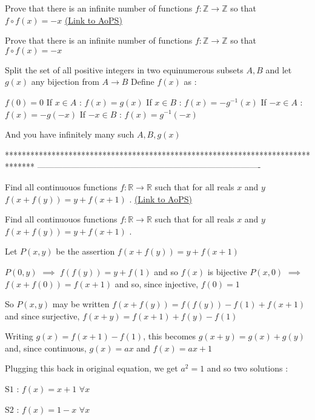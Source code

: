 \begin{problem}
	Prove that there is an infinite number of functions $f:\mathbb{Z}\rightarrow \mathbb{Z}$ so that $f\circ f (x)=-x$
	\flushright \href{https://artofproblemsolving.com/community/c6h578546}{(Link to AoPS)}
\end{problem}



\begin{solution}
	\begin{tcolorbox}Prove that there is an infinite number of functions $f:\mathbb{Z}\rightarrow \mathbb{Z}$ so that $f\circ f (x)=-x$\end{tcolorbox}
Split the set of all positive integers in two equinumerous subsets $A,B$ and let $g(x)$ any bijection from $A\to B$
Define $f(x)$ as :

$f(0)=0$
If $x\in A$ : $f(x)=g(x)$
If $x\in B$ : $f(x)=-g^{-1}(x)$
If $-x\in A$ : $f(x)=-g(-x)$
If $-x\in B$ : $f(x)=g^{-1}(-x)$

And you have infinitely many such $A,B,g(x)$
\end{solution}
*******************************************************************************
-------------------------------------------------------------------------------

\begin{problem}
	Find all continuouos functions $ f: \mathbb{R}\to\mathbb{R} $ such that for all reals $ x $ and $ y $ 
$ f(x+f(y))=y+f(x+1) $ .
	\flushright \href{https://artofproblemsolving.com/community/c6h578688}{(Link to AoPS)}
\end{problem}



\begin{solution}
	\begin{tcolorbox}Find all continuouos functions $ f: \mathbb{R}\to\mathbb{R} $ such that for all reals $ x $ and $ y $ 
$ f(x+f(y))=y+f(x+1) $ .\end{tcolorbox}
Let $P(x,y)$ be the assertion $f(x+f(y))=y+f(x+1)$

$P(0,y)$ $\implies$ $f(f(y))=y+f(1)$ and so $f(x)$ is bijective
$P(x,0)$ $\implies$ $f(x+f(0))=f(x+1)$ and so, since injective, $f(0)=1$

So $P(x,y)$ may be written $f(x+f(y))=f(f(y))-f(1)+f(x+1)$ and since surjective, $f(x+y)=f(x+1)+f(y)-f(1)$

Writing $g(x)=f(x+1)-f(1)$, this becomes $g(x+y)=g(x)+g(y)$ and, since continuous, $g(x)=ax$ and $f(x)=ax+1$

Plugging this back in original equation, we get $a^2=1$ and so two solutions :

$\boxed{\text{S1 : }f(x)=x+1}$ $\forall x$

$\boxed{\text{S2 : }f(x)=1-x}$ $\forall x$
\end{solution}



